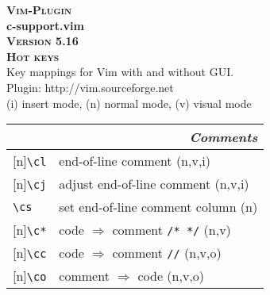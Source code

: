 \documentclass[oneside,11pt,landscape,DIV16]{scrartcl}
\newcommand{\Pluginversion}{5.16}
\newcommand{\Rep}{{\tiny{[n]}}}
\begin{document}
%

\begin{multicols}{3}
%
\begin{center}
\textbf{\textsc{\small{Vim-Plugin}}}\\
\textbf{\LARGE{c-support.vim}}\\
\textbf{\textsc{\small{Version \Pluginversion}}}\\
\textbf{\textsc{\Huge{Hot keys}}}\\ 
Key mappings for Vim with and without GUI.\\
Plugin: http://vim.sourceforge.net\\
\vspace{3.0mm}
{\normalsize (i)} insert mode, {\normalsize (n)} normal mode, {\normalsize (v)} visual mode\\
\vspace{5.0mm}
%
\begin{tabular}[]{|p{10mm}|p{60mm}|}
%
\hline
\multicolumn{2}{|r|}{\textsl{\textbf{C}omments}} \\
\hline \Rep\verb'\cl' & end-of-line comment                     \hfill (n,v,i)                                   \\
\hline \Rep\verb'\cj' & adjust end-of-line comment              \hfill (n,v,i)                                   \\
\hline     \verb'\cs' & set end-of-line comment column          \hfill (n)                                       \\
\hline \Rep\verb'\c*' & code $\Rightarrow$ comment \verb'/* */' \hfill (n,v)                                     \\
\hline \Rep\verb'\cc' & code $\Rightarrow$ comment \verb'//'    \hfill (n,v,o)                                   \\
\hline \Rep\verb'\co' & comment $\Rightarrow$ code              \hfill (n,v,o)                                   \\


\end{tabular}
\end{center}
\end{multicols}
\end{document}
